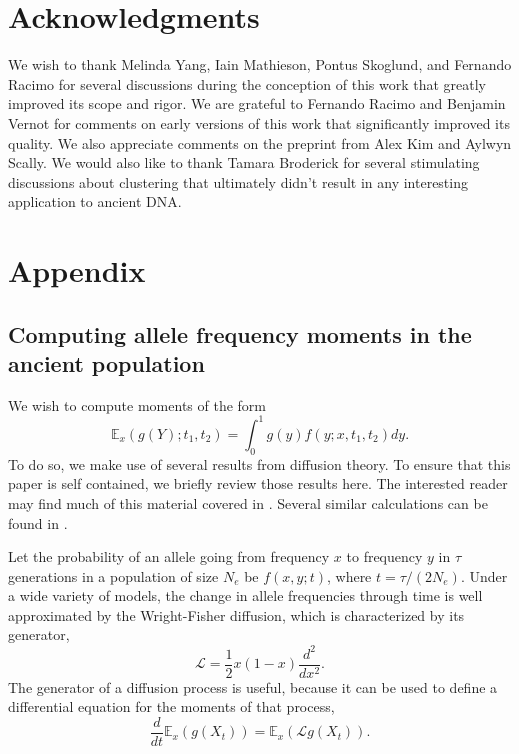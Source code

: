 \documentclass[11pt, oneside]{article}   	%
\begin{document}
\section{Acknowledgments}
We wish to thank Melinda Yang, Iain Mathieson, Pontus Skoglund, and Fernando Racimo for several discussions during the conception of this work that greatly improved its scope and rigor. We are grateful to Fernando Racimo and Benjamin Vernot for comments on early versions of this work that significantly improved its quality. We also appreciate comments on the preprint from Alex Kim and Aylwyn Scally. We would also like to thank Tamara Broderick for several stimulating discussions about clustering that ultimately didn't result in any interesting application to ancient DNA. 

 
 

\section{Appendix}
\subsection{Computing allele frequency moments in the ancient population}
We wish to compute moments of the form
\begin{equation}
\mathbb{E}_x(g(Y); t_1, t_2) = \int_0^1 g(y) f(y; x, t_1, t_2)dy.
\label{cond_exp}
\end{equation}
To do so, we make use of several results from diffusion theory. To ensure that this paper is self contained, we briefly review those results here. The interested reader may find much of this material covered in \citet{ewens2012mathematical, karlin1981second}. Several similar calculations can be found in \citet{griffiths2003frequency}.

Let the probability of an allele going from frequency $x$ to frequency $y$ in $\tau$ generations in a population of size $N_e$ be $f(x,y; t)$, where $t = \tau/(2N_e)$. Under a wide variety of models, the change in allele frequencies through time is well approximated by the Wright-Fisher diffusion, which is characterized by its generator,
\[
\mathcal{L} = \frac{1}{2}x(1-x)\frac{d^2}{dx^2}.
\]
The generator of a diffusion process is useful, because it can be used to define a differential equation for the moments of that process,
\begin{equation}
\frac{d}{dt}\mathbb{E}_x(g(X_t)) = \mathbb{E}_x \left( \mathcal{L} g(X_t) \right).
\label{expectation_ode}
\end{equation}
\end{document}
